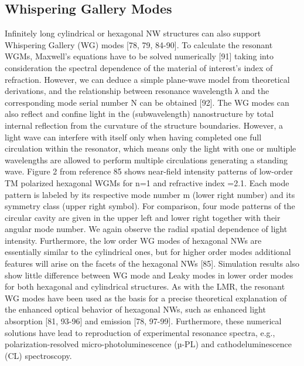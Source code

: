 \subsection{Whispering Gallery Modes}
\label{sec:host}
Infinitely long cylindrical or hexagonal NW structures can also support Whispering Gallery (WG) modes [78, 79, 84-90]. To calculate the resonant WGMs, Maxwell’s equations have to be solved numerically [91] taking into consideration the spectral dependence of the material of interest’s index of refraction. However, we can deduce a simple plane-wave model from theoretical derivations, and the relationship between resonance wavelength λ and the corresponding mode serial number N can be obtained [92]. The WG modes can also reflect and confine light in the (subwavelength) nanostructure by total internal reflection from the curvature of the structure boundaries. However, a light wave can interfere with itself only when having completed one full circulation within the resonator, which means only the light with one or multiple wavelengths are allowed to perform multiple circulations generating a standing wave. Figure 2 from reference 85 shows near-field intensity patterns of low-order TM polarized hexagonal WGMs for n=1 and refractive index =2.1. Each mode pattern is labeled by its respective mode number m (lower right number) and its symmetry class (upper right symbol). 
For comparison, four mode patterns of the circular cavity are given in the upper left and lower right together with their angular mode number. We again observe the radial spatial dependence of light intensity. Furthermore, the low order WG modes of hexagonal NWs are essentially similar to the cylindrical ones, but for higher order modes additional features will arise on the facets of the hexagonal NWs [85]. Simulation results also show little difference between WG mode and Leaky modes in lower order modes for both hexagonal and cylindrical structures. As with the LMR, the resonant WG modes have been used as the basis for a precise theoretical explanation of the enhanced optical behavior of hexagonal NWs, such as enhanced light absorption [81, 93-96] and emission [78, 97-99]. Furthermore, these numerical solutions have lead to reproduction of experimental resonance spectra, e.g., polarization-resolved micro-photoluminescence (µ-PL) and cathodeluminescence (CL) spectroscopy. 

